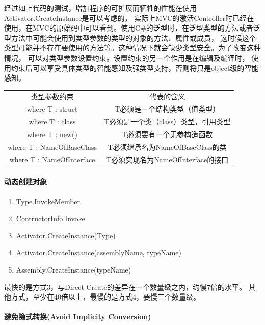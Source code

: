 \documentclass{book}
\begin{document}
经过如上代码的测试，增加程序的可扩展而牺牲的性能在使用Activator.CreateInstance是可以考虑的，
实际上MVC的激活Controller时已经在使用，在MVC的原始码中可以看到。使用C\#的泛型时，在泛型类型的方法或者泛型方法中可能会使用到类型参数的类型的对象的方法、属性或成员，
这时候这个类型可能并不存在要使用的方法等。这种情况下就会缺少类型安全。为了改变这种情况，
可以对类型参数设置约束。设置约束的另一个作用是在编辑及编译时，
使用约束后可以享受具体类型的智能感知及强类型支持，否则将只是object级的智能感知。

\begin{tabular}{|c|c|}
	\hline
	\multirow{1}{*}{类型参数约束}
	& \multicolumn{1}{c|}{代表的含义}\\ 		
	\cline{1-2}
	where T : struct & T必须是一个结构类型（值类型）\\
	\hline
	where T : class & T必须是一个类（class）类型，引用类型\\
	\hline
	where T : new() & T必须要有一个无参构造函数\\
	\hline
	where T : NameOfBaseClass & T必须继承名为NameOfBaseClass的类\\
	\hline
	where T : NameOfInterface & T必须实现名为NameOfInterface的接口\\
	\hline	
\end{tabular}

\paragraph{动态创建对象}

\begin{enumerate}
	\setcounter{enumi}{0}
	\item{Type.InvokeMember}
	\item{ContructorInfo.Invoke}
	\item{Activator.CreateInstance(Type)}
	\item{Activator.CreateInstance(assemblyName, typeName)}
	\item{Assembly.CreateInstance(typeName)}
\end{enumerate}

最快的是方式3，与Direct Create的差异在一个数量级之内，约慢7倍的水平。
其他方式，至少在40倍以上，最慢的是方式4，要慢三个数量级。 




\paragraph{避免隐式转换(Avoid Implicity Conversion)}
\end{document}
